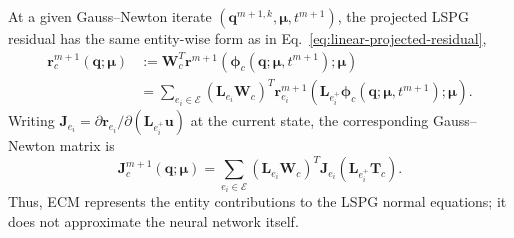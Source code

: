\documentclass[11pt]{article}
\begin{document}
At a given Gauss--Newton iterate $(\mathbf q^{m+1,k},\bm\mu,t^{m+1})$, the
projected LSPG residual has the same entity-wise form as in
Eq.~\eqref{eq:linear-projected-residual},
\begin{equation}
\begin{aligned}
\mathbf r_c^{m+1}(\mathbf q;\bm\mu)
&:=\mathbf W_c^T\mathbf r^{m+1}
\!\left(\boldsymbol\phi_c(\mathbf q;\bm\mu,t^{m+1});\bm\mu\right)\\
&=
\sum_{e_i\in\mathcal E}
\left(\mathbf L_{e_i}\mathbf W_c\right)^T
\mathbf r_{e_i}^{m+1}
\!\left(\mathbf L_{e_i^+}\boldsymbol\phi_c(\mathbf q;\bm\mu,t^{m+1});\bm\mu\right).
\end{aligned}
\label{eq:ann-ecm-projected-residual}
\end{equation}
Writing $\mathbf J_{e_i}=\partial\mathbf r_{e_i}/\partial(\mathbf L_{e_i^+}\mathbf u)$
at the current state, the corresponding Gauss--Newton matrix is
\begin{equation}
\mathbf J_c^{m+1}(\mathbf q;\bm\mu)
=
\sum_{e_i\in\mathcal E}
\left(\mathbf L_{e_i}\mathbf W_c\right)^T
\mathbf J_{e_i}
\left(\mathbf L_{e_i^+}\mathbf T_c\right).
\label{eq:ann-ecm-projected-jacobian}
\end{equation}
Thus, ECM represents the entity contributions to the LSPG normal equations;
it does not approximate the neural network itself.
\end{document}
